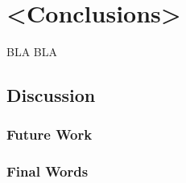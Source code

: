 \chapter{<Conclusions>}
BLA BLA
\section{Discussion}

\subsection{Future Work}

\subsection{Final Words}







